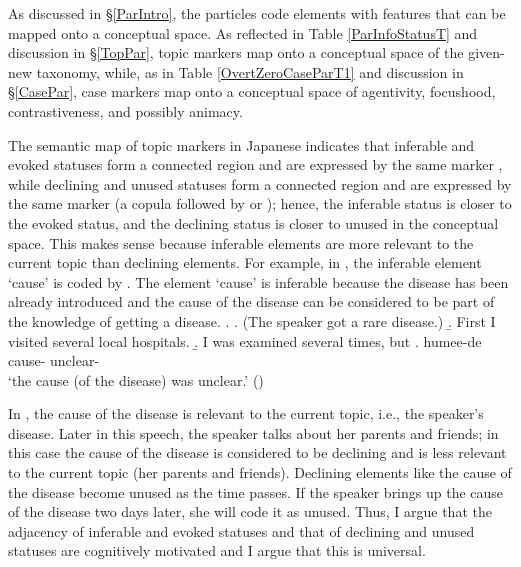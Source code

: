 As discussed in \S \ref{ParIntro},
the particles code elements with features that can be mapped onto a conceptual space.
As reflected in Table \ref{ParInfoStatusT} and discussion in \S \ref{TopPar},
topic markers map onto a conceptual space of the given-new taxonomy,
while, as in Table \ref{OvertZeroCaseParT1} and discussion in \S \ref{CasePar},
case markers map onto a conceptual space of agentivity, focushood, contrastiveness, and possibly animacy.

The semantic map of topic markers in Japanese indicates that
inferable and evoked statuses form a connected region and are expressed by the same marker ,
while declining and unused statuses form a connected region and are expressed by the same marker (a copula followed by  or );
hence, the inferable status is closer to the evoked status, and the declining status is closer to unused in the conceptual space.
This makes sense because inferable elements are more relevant to
the current topic than declining elements.
For example, in \Next,
the inferable element  `cause' is coded by .
The element `cause' is inferable because the disease has been already introduced and the cause of the disease can be considered to be part of the knowledge of getting a disease.
%
\ex.
 \a. (The speaker got a rare disease.)
 \b. First I visited several local hospitals.
 \b. I was examined several times, but
 \bg.  humee-de \\
   cause- unclear- \\
   `the cause (of the disease) was unclear.'
   \hfill{()}
%

In \Last,
the cause of the disease is relevant to the current topic, i.e., the speaker's disease.
Later in this speech,
the speaker talks about her parents and friends;
in this case the cause of the disease is considered to be declining and is less relevant to the current topic (her parents and friends).
Declining elements like the cause of the disease become unused as the time passes.
If the speaker brings up the cause of the disease two days later,
she will code it as unused.
Thus, I argue that the adjacency of inferable and evoked statuses and that of declining and unused statuses are cognitively motivated and I argue that this is universal.

